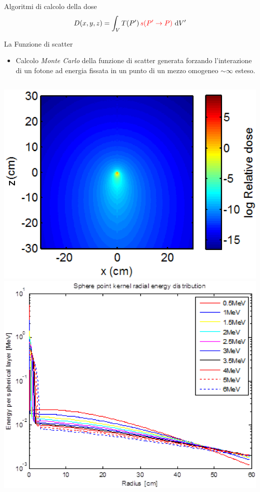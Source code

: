 \documentclass{beamer}
\newcommand{\de}{\,\textrm{d}}
\begin{document}
\begin{frame}{Algoritmi di calcolo della dose}
\small \vspace{-.6cm}
\footnotesize
\begin{equation*}
D(x,y,z) = \int_V T(P')\,{\color{red}s(P'\rightarrow P)}\, \de V'
\end{equation*}

\vspace{.5cm}

{\color{red}La Funzione di scatter}

\vspace{.2cm}

\scriptsize
\begin{itemize}
\item Calcolo \textit{Monte Carlo} della funzione di scatter generata forzando l'interazione di un fotone ad energia fissata in un punto di un mezzo omogeneo $\sim{}\infty$ esteso.
\end{itemize}
\begin{columns}
\centering
\includegraphics[width=\textwidth]{../cap1/kern_ray1.png}
\centering
\includegraphics[width=\textwidth]{../cap1/kern_ray2.png}
\end{columns}
\end{frame}
\end{document}
